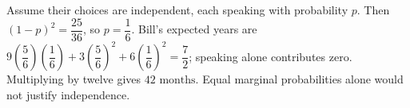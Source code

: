 Assume their choices are independent, each speaking with probability $p$. Then $(1-p)^2=\dfrac{25}{36}$, so $p=\dfrac{1}{6}$. Bill's expected years are $9(\dfrac{5}{6})(\dfrac{1}{6})+3(\dfrac{5}{6})^2+6(\dfrac{1}{6})^2=\dfrac{7}{2}$; speaking alone contributes zero. Multiplying by twelve gives $\boxed{42\text{ months}}$. Equal marginal probabilities alone would not justify independence.
